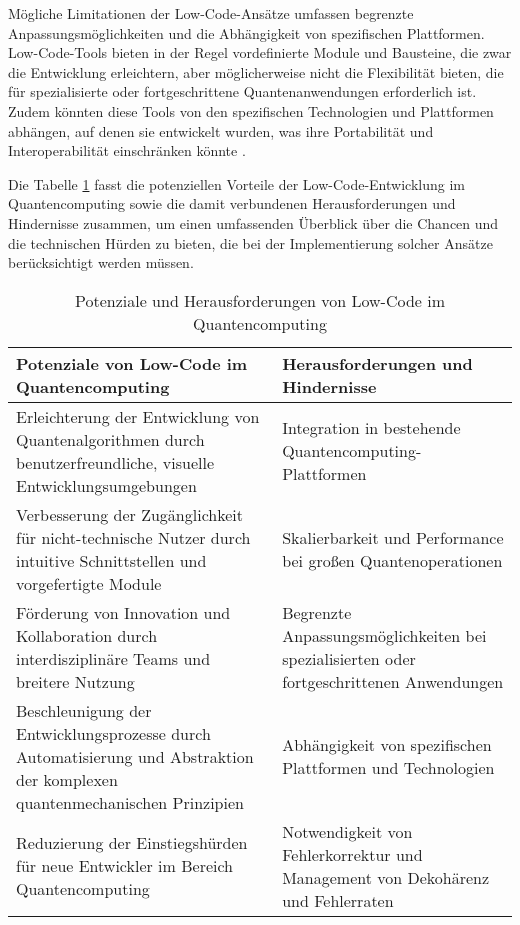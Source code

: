 Mögliche Limitationen der Low-Code-Ansätze umfassen begrenzte Anpassungsmöglichkeiten und die 
Abhängigkeit von spezifischen Plattformen. Low-Code-Tools bieten in der Regel vordefinierte 
Module und Bausteine, die zwar die Entwicklung erleichtern, aber möglicherweise nicht die 
Flexibilität bieten, die für spezialisierte oder fortgeschrittene Quantenanwendungen erforderlich 
ist. Zudem könnten diese Tools von den spezifischen Technologien und Plattformen abhängen, auf denen 
sie entwickelt wurden, was ihre Portabilität und Interoperabilität einschränken könnte \cite{nielsen2010quantum}.

Die Tabelle \ref{tab:lowcode_potentials_challenges} fasst die potenziellen Vorteile der 
Low-Code-Entwicklung im Quantencomputing sowie die damit verbundenen Herausforderungen und Hindernisse 
zusammen, um einen umfassenden Überblick über die Chancen und die technischen Hürden zu bieten, die 
bei der Implementierung solcher Ansätze berücksichtigt werden müssen.

\begin{table}[h!]
    \centering
    \begin{tabular}{|p{7cm}|p{7cm}|}
    \hline
    \textbf{Potenziale von Low-Code im Quantencomputing} & \textbf{Herausforderungen und Hindernisse} \\
    \hline
    Erleichterung der Entwicklung von Quantenalgorithmen durch benutzerfreundliche, visuelle Entwicklungsumgebungen & Integration in bestehende Quantencomputing-Plattformen \\
    \hline
    Verbesserung der Zugänglichkeit für nicht-technische Nutzer durch intuitive Schnittstellen und vorgefertigte Module & Skalierbarkeit und Performance bei großen Quantenoperationen \\
    \hline
    Förderung von Innovation und Kollaboration durch interdisziplinäre Teams und breitere Nutzung & Begrenzte Anpassungsmöglichkeiten bei spezialisierten oder fortgeschrittenen Anwendungen \\
    \hline
    Beschleunigung der Entwicklungsprozesse durch Automatisierung und Abstraktion der komplexen quantenmechanischen Prinzipien & Abhängigkeit von spezifischen Plattformen und Technologien \\
    \hline
    Reduzierung der Einstiegshürden für neue Entwickler im Bereich Quantencomputing & Notwendigkeit von Fehlerkorrektur und Management von Dekohärenz und Fehlerraten \\
    \hline
    \end{tabular}
    \caption{Potenziale und Herausforderungen von Low-Code im Quantencomputing}
    \label{tab:lowcode_potentials_challenges}
\end{table}
    
